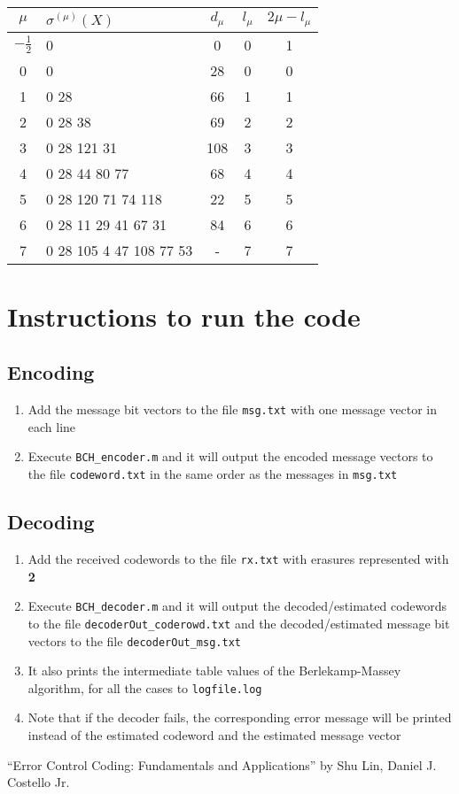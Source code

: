 \documentclass[10 pt]{article}
\begin{document}
\begin{center}
  	\begin{tabular}{ c | l | c | c | c }
        \toprule
        $\mu$ & $\sigma^{(\mu)}(X)$ & $d_{\mu}$ & $l_{\mu}$ & $2\mu - l_{\mu}$ \\ \hline
        $-\frac{1}{2}$ & 0 & 0 & 0 & 1 \\ \hline
        0 & 0 & 28 & 0 & 0 \\ \hline
        1 & 0 28 & 66 & 1 & 1 \\ \hline
        2 & 0 28 38 & 69 & 2 & 2 \\ \hline
        3 & 0 28 121 31 & 108 & 3 & 3 \\ \hline
        4 & 0 28 44 80 77 & 68 & 4 & 4 \\ \hline
        5 & 0 28 120 71 74 118 & 22 & 5 & 5 \\ \hline
        6 & 0 28 11 29 41 67 31 & 84 & 6 & 6 \\ \hline
        7 & 0 28 105 4 47 108 77 53 & - & 7 & 7 \\
		\bottomrule
    \end{tabular}
\end{center}

\section{Instructions to run the code}
\subsection{Encoding}
\renewcommand{\labelenumi}{(\roman{enumi})}
\begin{enumerate}
	\item Add the message bit vectors to the file \texttt{msg.txt} with one message vector in each line
    \item Execute \texttt{BCH\_encoder.m} and it will output the encoded message vectors to the file \texttt{codeword.txt} in the same order as the messages in \texttt{msg.txt}
\end{enumerate}

\subsection{Decoding}
\renewcommand{\labelenumi}{(\roman{enumi})}
\begin{enumerate}
	\item Add the received codewords to the file \texttt{rx.txt} with erasures represented with \textbf{2}
    \item Execute \texttt{BCH\_decoder.m} and it will output the decoded/estimated codewords to the file \texttt{decoderOut\_coderowd.txt} and the decoded/estimated message bit vectors to the file \texttt{decoderOut\_msg.txt}
    \item It also prints the intermediate table values of the Berlekamp-Massey algorithm, for all the cases to \texttt{logfile.log}
    \item Note that if the decoder fails, the corresponding error message will be printed instead of the estimated codeword and the estimated message vector
\end{enumerate}

\begin{thebibliography}{9}
  ``Error Control Coding: Fundamentals and Applications'' by Shu Lin, Daniel J. Costello Jr.
\end{thebibliography}
\end{document}
